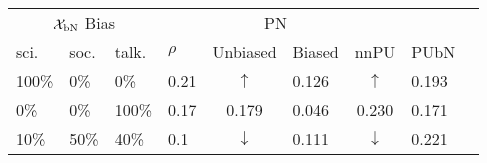 \begin{tabular}{@{}lllllllll@{}}
  \toprule
  \multicolumn{3}{c}{$\mathcal{X}_{\textnormal{bN}}$ Bias} &    & \multicolumn{2}{c}{PN} &       &      \\\cmidrule{1-3}\cmidrule{5-6}
  sci.   & soc.   & talk.       & $\rho$   & Unbiased                          & Biased          & nnPU                             & PUbN \\\midrule
  100\%  & 0\%    & 0\%         & 0.21     & \multicolumn{1}{c}{$\uparrow$}    & 0.126           & \multicolumn{1}{c}{$\uparrow$}   & 0.193 \\
  0\%    & 0\%    & 100\%       & 0.17     & \multicolumn{1}{c}{0.179}         & 0.046           & \multicolumn{1}{c}{0.230}        & 0.171 \\
  10\%   & 50\%   & 40\%        & 0.1      & \multicolumn{1}{c}{$\downarrow$}  & 0.111           & \multicolumn{1}{c}{$\downarrow$} & 0.221 \\
  \bottomrule
\end{tabular}
